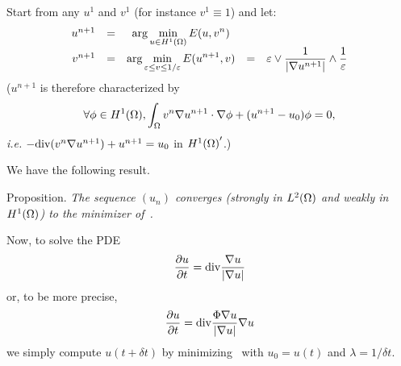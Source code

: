 Start from any $u^1$ and $v^1$ (for instance $v^1\equiv 1$) and
let:
\begin{equation}
\begin{array}{rcccl}
u^{n+1} &=& \displaystyle{\mbox{arg}\min_{u\in {H}^1(\Omega)} E(u,v^n)} & & \\
v^{n+1} &=& \displaystyle{\mbox{arg}\min_{\varepsilon\leq v \leq 1/\varepsilon} E(u^{n+1},v)} &=&
\displaystyle{ \varepsilon\vee {1\over |\nabla u^{n+1}|} \wedge {1\over \varepsilon}}
\end{array}\end{equation}
($u^{n+1}$ is therefore characterized by
\[ \forall \phi\in {H}^1(\Omega), \int_\Omega v^n\nabla u^{n+1}\cdot\nabla \phi
+ (u^{n+1}-u_0) \phi = 0, \]
{\em i.e.\/} $-\mbox{div}(v^n\nabla u^{n+1}) + u^{n+1} = u_0$ in ${{H}^1(\Omega)}'$.)

We have the following result.
\medskip

{\sc Proposition. }
{\em The sequence $(u_n)$
converges (strongly in ${L}^{2}(\Omega)$ and weakly in ${H}^1(\Omega)$)
to the minimizer of~.}
\medskip

Now, to solve the PDE
\[ \frac{\partial u}{\partial t} = \mbox{div} \frac{\nabla u}{|\nabla u|} \]
or, to be more precise,
\[ \frac{\partial u}{\partial t} = \mbox{div} \frac{\Phi{\nabla u}}{|\nabla u|}\nabla u \]
we simply compute $u(t+\delta t)$ by minimizing~ with
$u_0 = u(t)$ and $\lambda = 1/\delta t$.

